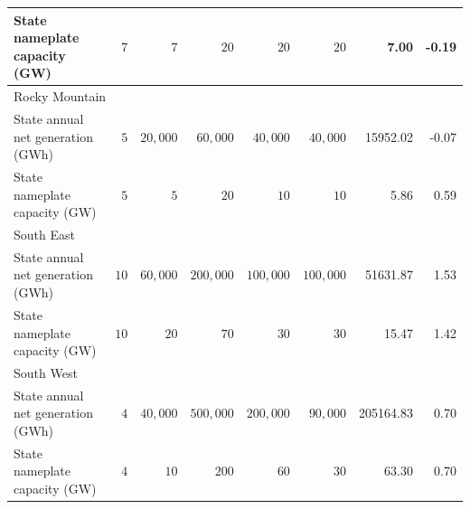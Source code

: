 \documentclass[
]{article}
\begin{document}
\begin{longtable}{lrrrrrrr}
State nameplate capacity (GW) & $7$ & $7$ & $20$ & $20$ & $20$ & 7.00 & -0.19 \\ 
\midrule
\multicolumn{8}{l}{Rocky Mountain} \\ 
\midrule
State annual net generation (GWh) & $5$ & $20,000$ & $60,000$ & $40,000$ & $40,000$ & 15952.02 & -0.07 \\ 
State nameplate capacity (GW) & $5$ & $5$ & $20$ & $10$ & $10$ & 5.86 & 0.59 \\ 
\midrule
\multicolumn{8}{l}{South East} \\ 
\midrule
State annual net generation (GWh) & $10$ & $60,000$ & $200,000$ & $100,000$ & $100,000$ & 51631.87 & 1.53 \\ 
State nameplate capacity (GW) & $10$ & $20$ & $70$ & $30$ & $30$ & 15.47 & 1.42 \\ 
\midrule
\multicolumn{8}{l}{South West} \\ 
\midrule
State annual net generation (GWh) & $4$ & $40,000$ & $500,000$ & $200,000$ & $90,000$ & 205164.83 & 0.70 \\ 
State nameplate capacity (GW) & $4$ & $10$ & $200$ & $60$ & $30$ & 63.30 & 0.70 \\ 
\bottomrule
\end{longtable}
\end{document}
